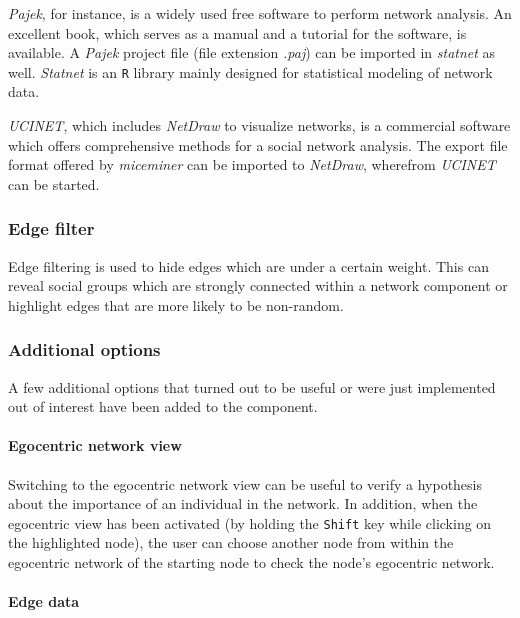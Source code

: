 \textit{Pajek}\citep{pajek}, for instance, is a widely used free software to perform network analysis. An excellent book\citep{pajek:03}, which serves as a manual and a tutorial for the software, is available. A \textit{Pajek} project file (file extension \textit{.paj}) can be imported in \textit{statnet}\citep{statnet:03} as well. \textit{Statnet} is an \lstinline|R|\citep{r:05} library mainly designed for statistical modeling of network data.

\textit{UCINET}\citep{ucinet:99}, which includes \textit{NetDraw} to visualize networks, is a commercial software which offers comprehensive methods for a social network analysis. The export file format offered by \textit{miceminer} can be imported to \textit{NetDraw}, wherefrom \textit{UCINET} can be started.

\subsubsection*{Edge filter}

Edge filtering is used to hide edges which are under a certain weight. This can reveal social groups which are strongly connected within a network component or highlight edges that are more likely to be non-random.

\subsubsection*{Additional options}

A few additional options that turned out to be useful or were just implemented out of interest have been added to the component.

\paragraph{Egocentric network view}

Switching to the egocentric network view can be useful to verify a hypothesis about the importance of an individual in the network. In addition, when the egocentric view has been activated (by holding the \lstinline|Shift| key while clicking on the highlighted node), the user can choose another node from within the egocentric network of the starting node to check the node's egocentric network.

\paragraph{Edge data}

